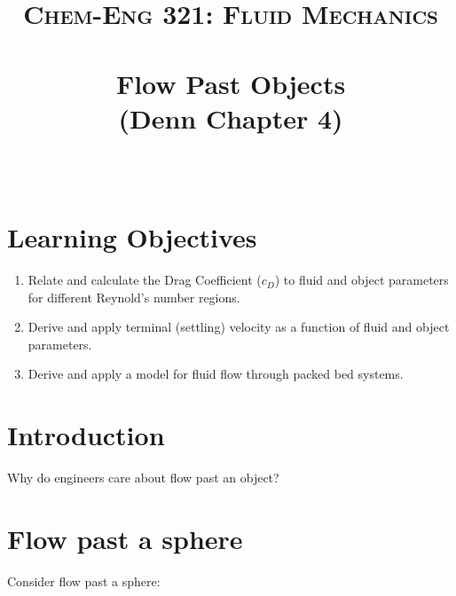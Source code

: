 \documentclass[paper=a4, fontsize=12pt]{scrartcl} %
\author{\vspace{-5ex}}
\date{\vspace{-10ex}}
\title{	
\normalfont \normalsize 
\textsc{Chem-Eng 321: Fluid Mechanics} \\ [10pt] %
\horrule{0.5pt} \\[0.2cm] %
\huge Flow Past Objects \\ (Denn Chapter 4) \\ %
\horrule{2pt} \\[0.2cm] %
}
\numberwithin{equation}{section} %
\numberwithin{figure}{section} %
\numberwithin{table}{section} %
\begin{document}
\maketitle %

\thispagestyle{empty}

\section*{Learning Objectives}

\begin{enumerate}
\item Relate and calculate the Drag Coefficient ($c_D$) to fluid and object parameters for different Reynold's number regions.
\item Derive and apply terminal (settling) velocity as a function of fluid and object parameters.
\item Derive and apply a model for fluid flow through packed bed systems.
\end{enumerate}

\section*{Introduction}

Why do engineers care about flow past an object?


\vspace{10ex} \section*{Flow past a sphere}
Consider flow past a sphere:
\end{document}
